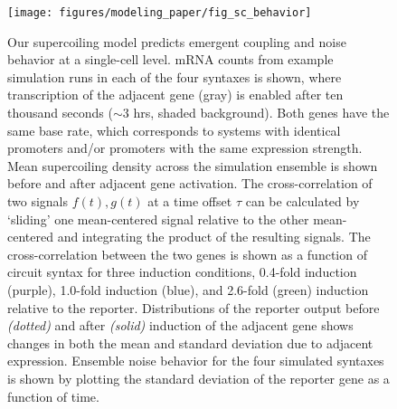 \documentclass[11pt]{article}
\begin{document}
\begin{figure}[htbp]
    \centering
    {\texttt{[image: figures/modeling\_paper/fig\_sc\_behavior]}
    \label{fig:orientation_examples} %
    \label{fig:sc_density_turn_on}
    \label{fig:cross_correlation_cartoon}
    \label{fig:orientation_cross_correlation}
    \label{fig:output_distribution_by_orientation_dynamics}
    \label{fig:noise_by_orientation}
    }
\end{figure}
\begin{figure}[htbp]
    \ContinuedFloat
    \caption{Our supercoiling model predicts emergent coupling and noise behavior at a single-cell level.
         mRNA counts from example simulation runs in each of the four syntaxes is shown, where transcription of the adjacent gene (gray) is enabled after ten thousand seconds (\(\sim\)3 hrs, shaded background). Both genes have the same base rate, which corresponds to systems with identical promoters and/or promoters with the same expression strength. %
         Mean supercoiling density across the simulation ensemble is shown before and after adjacent gene activation.
         The cross-correlation of two signals \(f(t), g(t)\) at a time offset \(\tau\) can be calculated by `sliding' one mean-centered signal relative to the other mean-centered and integrating the product of the resulting signals.
         The cross-correlation between the two genes is shown as a function of circuit syntax for three induction conditions, 0.4-fold induction (purple), 1.0-fold induction (blue), and 2.6-fold (green) induction relative to the reporter.
         Distributions of the reporter output before \textit{(dotted)} and after \textit{(solid)} induction of the adjacent gene shows changes in both the mean and standard deviation due to adjacent expression.
         Ensemble noise behavior for the four simulated syntaxes is shown by plotting the standard deviation of the reporter gene as a function of time. 
    }
    \label{fig:top:single_cell_noise_correlation}
\end{figure}
\end{document}
